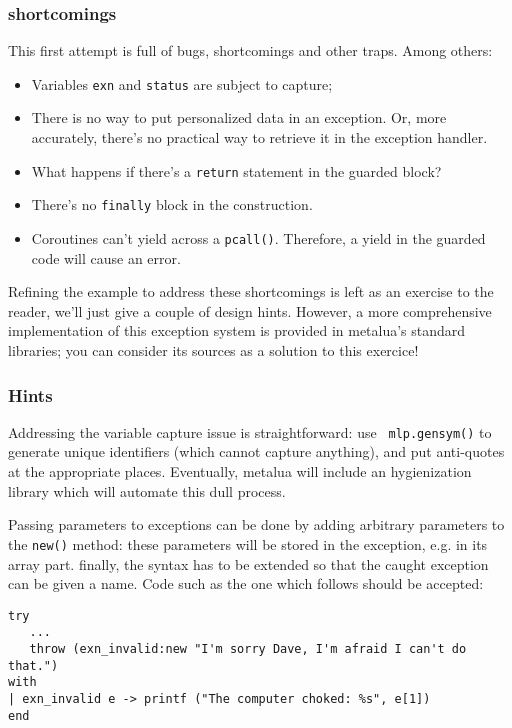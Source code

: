 \subsubsection{shortcomings}
This first attempt is full of bugs, shortcomings and other
traps. Among others:
\begin{itemize}
\item Variables {\tt exn} and {\tt status} are subject to capture;
\item There is no way to put personalized data in an exception. Or,
  more accurately, there's no practical way to retrieve it in the
  exception handler.
\item What happens if there's a {\tt return} statement in the guarded
  block?
\item There's no {\tt finally} block in the construction.
\item Coroutines can't yield across a {\tt pcall()}. Therefore, a
  yield in the guarded code will cause an error.
\end{itemize}

Refining the example to address these shortcomings is left as an
exercise to the reader, we'll just give a couple of design
hints. However, a more comprehensive implementation of this exception
system is provided in metalua's standard libraries; you can consider
its sources as a solution to this exercice!

\subsubsection{Hints}
Addressing the variable capture issue is straightforward: use {\tt
  mlp.gensym()} to generate unique identifiers (which cannot capture
anything), and put anti-quotes at the appropriate places. Eventually,
metalua will include an hygienization library which will automate this
dull process. 

Passing parameters to exceptions can be done by adding arbitrary
parameters to the {\tt new()} method: these parameters will be stored
in the exception, e.g. in its array part. finally, the
syntax has to be extended so that the caught exception can be given a
name. Code such as the one which follows should be accepted:

\begin{Verbatim}[fontsize=\scriptsize]
try
   ...
   throw (exn_invalid:new "I'm sorry Dave, I'm afraid I can't do that.")
with
| exn_invalid e -> printf ("The computer choked: %s", e[1])
end
\end{Verbatim}

